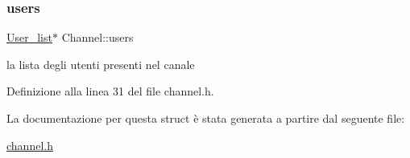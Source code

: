 \subsubsection{\texorpdfstring{users}{users}}
{\footnotesize\ttfamily \hyperlink{user_8h_a2bea59709d82bd0d4c29c992bf9c7607}{User\+\_\+list}$\ast$ Channel\+::users}



la lista degli utenti presenti nel canale 



Definizione alla linea 31 del file channel.\+h.



La documentazione per questa struct è stata generata a partire dal seguente file\+:\begin{DoxyCompactItemize}
\item 
\hyperlink{channel_8h}{channel.\+h}\end{DoxyCompactItemize}
